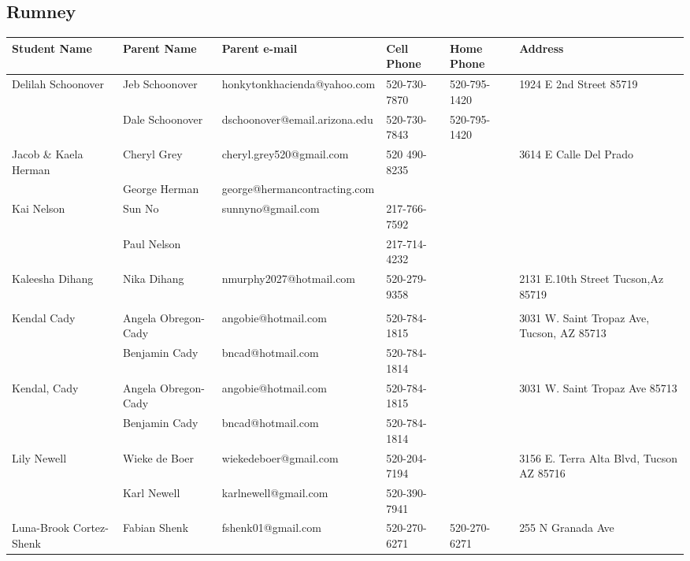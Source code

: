 \documentclass[landscape]{article}\usepackage[]{graphicx}\usepackage[]{color}
\begin{document}
\subsection{Rumney}
\begin{longtable}{|p{100pt}|p{100pt}|p{140pt}|p{60pt}|p{64pt}|p{120pt}|}
\textbf{Student Name} & \textbf{Parent Name} & \textbf{Parent e-mail} & \textbf{Cell Phone} & \textbf{Home Phone} & \textbf{Address}\\
\hline
\hline
\multirow{2}{100pt}{Delilah Schoonover} & Jeb Schoonover & honkytonkhacienda@yahoo.com & 520-730-7870 & 520-795-1420 & \multirow{2}{120pt}{1924 E 2nd Street 85719} \\
 & Dale Schoonover & dschoonover@email.arizona.edu & 520-730-7843 & 520-795-1420 & \\
\hline
\multirow{2}{100pt}{Jacob \& Kaela Herman} & Cheryl Grey & cheryl.grey520@gmail.com & 520 490-8235 &  & \multirow{2}{120pt}{3614 E Calle Del Prado} \\
 & George Herman & george@hermancontracting.com &  &  & \\
\hline
\multirow{2}{100pt}{Kai Nelson} & Sun No & sunnyno@gmail.com & 217-766-7592 &  & \multirow{2}{120pt}{} \\
 & Paul Nelson &  & 217-714-4232 &  & \\
\hline
\multirow{2}{100pt}{Kaleesha Dihang} & Nika Dihang & nmurphy2027@hotmail.com & 520-279-9358 &  & \multirow{2}{120pt}{2131 E.10th Street Tucson,Az 85719} \\
 &  &  &  &  & \\
\hline
\multirow{2}{100pt}{Kendal Cady} & Angela Obregon-Cady & angobie@hotmail.com & 520-784-1815 &  & \multirow{2}{120pt}{3031 W. Saint Tropaz Ave, Tucson, AZ 85713} \\
 & Benjamin Cady & bncad@hotmail.com & 520-784-1814 &  & \\
\hline
\multirow{2}{100pt}{Kendal, Cady} & Angela Obregon-Cady & angobie@hotmail.com & 520-784-1815 &  & \multirow{2}{120pt}{3031 W. Saint Tropaz Ave 85713} \\
 & Benjamin Cady & bncad@hotmail.com & 520-784-1814 &  & \\
\hline
\multirow{2}{100pt}{Lily Newell} & Wieke de Boer & wiekedeboer@gmail.com & 520-204-7194 &  & \multirow{2}{120pt}{3156 E. Terra Alta Blvd, Tucson AZ 85716} \\
 & Karl Newell & karlnewell@gmail.com & 520-390-7941 &  & \\
\hline
\multirow{2}{100pt}{Luna-Brook Cortez-Shenk} & Fabian Shenk & fshenk01@gmail.com & 520-270-6271 & 520-270-6271 & \multirow{2}{120pt}{255 N Granada Ave} \\

\end{longtable}
\end{document}
